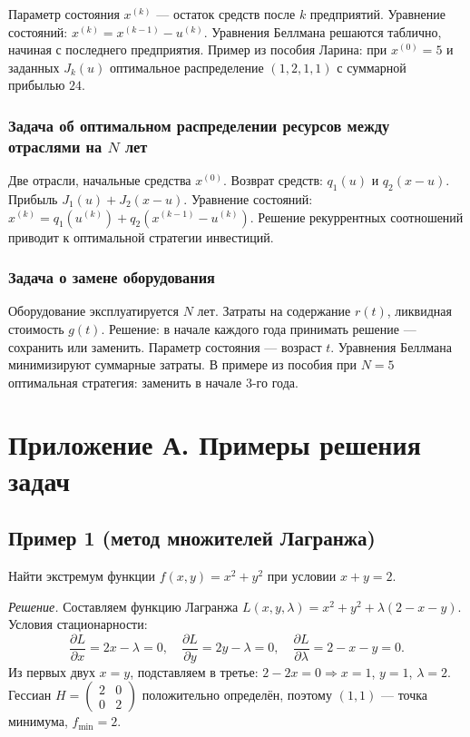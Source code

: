 \documentclass{article}
\theoremstyle{plain}
\begin{document}
Параметр состояния $x^{(k)}$ — остаток средств после $k$ предприятий. Уравнение состояний: $x^{(k)} = x^{(k-1)} - u^{(k)}$. Уравнения Беллмана решаются таблично, начиная с последнего предприятия. Пример из пособия Ларина: при $x^{(0)}=5$ и заданных $J_k(u)$ оптимальное распределение $(1,2,1,1)$ с суммарной прибылью $24$.

\subsubsection{Задача об оптимальном распределении ресурсов между отраслями на $N$ лет}
Две отрасли, начальные средства $x^{(0)}$. Возврат средств: $q_1(u)$ и $q_2(x-u)$. Прибыль $J_1(u)+J_2(x-u)$. Уравнение состояний: $x^{(k)} = q_1(u^{(k)}) + q_2(x^{(k-1)}-u^{(k)})$. Решение рекуррентных соотношений приводит к оптимальной стратегии инвестиций.

\subsubsection{Задача о замене оборудования}
Оборудование эксплуатируется $N$ лет. Затраты на содержание $r(t)$, ликвидная стоимость $g(t)$. Решение: в начале каждого года принимать решение — сохранить или заменить. Параметр состояния — возраст $t$. Уравнения Беллмана минимизируют суммарные затраты. В примере из пособия при $N=5$ оптимальная стратегия: заменить в начале 3-го года.


\section*{Приложение А. Примеры решения задач}

\subsection*{Пример 1 (метод множителей Лагранжа)}
Найти экстремум функции $f(x,y)=x^2+y^2$ при условии $x+y=2$.

\textit{Решение.} Составляем функцию Лагранжа $L(x,y,\lambda)=x^2+y^2+\lambda(2-x-y)$. Условия стационарности:
\[
\frac{\partial L}{\partial x}=2x-\lambda=0,\quad \frac{\partial L}{\partial y}=2y-\lambda=0,\quad \frac{\partial L}{\partial \lambda}=2-x-y=0.
\]
Из первых двух $x=y$, подставляем в третье: $2-2x=0 \Rightarrow x=1$, $y=1$, $\lambda=2$. Гессиан $H=\begin{pmatrix}2&0\\0&2\end{pmatrix}$ положительно определён, поэтому $(1,1)$ — точка минимума, $f_{\min}=2$.
\end{document}
